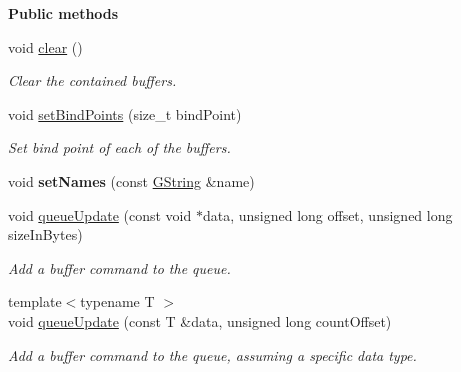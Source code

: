 \begin{Indent}\textbf{ Public methods}\par
\begin{DoxyCompactItemize}
\item 
\mbox{\label{classrev_1_1_buffer_queue_a934dcdde9b879478e38a1ab276b4b16a}} 
void \mbox{\hyperlink{classrev_1_1_buffer_queue_a934dcdde9b879478e38a1ab276b4b16a}{clear}} ()
\begin{DoxyCompactList}\small\item\em Clear the contained buffers. \end{DoxyCompactList}\item 
\mbox{\label{classrev_1_1_buffer_queue_a502dfd45dc9187d9147f96f2afb87a84}} 
void \mbox{\hyperlink{classrev_1_1_buffer_queue_a502dfd45dc9187d9147f96f2afb87a84}{set\+Bind\+Points}} (size\+\_\+t bind\+Point)
\begin{DoxyCompactList}\small\item\em Set bind point of each of the buffers. \end{DoxyCompactList}\item 
\mbox{\label{classrev_1_1_buffer_queue_a66652ae3ebfc58c3179de94eea0a9a99}} 
void {\bfseries set\+Names} (const \mbox{\hyperlink{classrev_1_1_g_string}{G\+String}} \&name)
\item 
\mbox{\label{classrev_1_1_buffer_queue_aac98888fa8ba547322632221e2f4128e}} 
void \mbox{\hyperlink{classrev_1_1_buffer_queue_aac98888fa8ba547322632221e2f4128e}{queue\+Update}} (const void $\ast$data, unsigned long offset, unsigned long size\+In\+Bytes)
\begin{DoxyCompactList}\small\item\em Add a buffer command to the queue. \end{DoxyCompactList}\item 
{\footnotesize template$<$typename T $>$ }\\void \mbox{\hyperlink{classrev_1_1_buffer_queue_a394c0cafdcabefca01f6f4dfa16d9009}{queue\+Update}} (const T \&data, unsigned long count\+Offset)
\begin{DoxyCompactList}\small\item\em Add a buffer command to the queue, assuming a specific data type. \end{DoxyCompactList}\item 

\end{DoxyCompactItemize}
\end{Indent}
